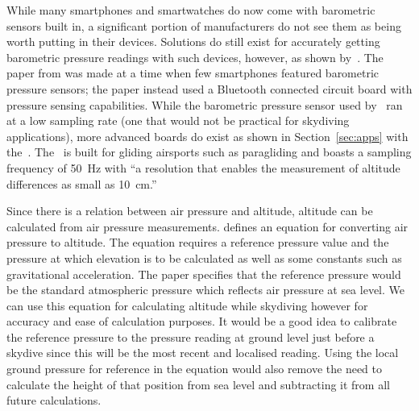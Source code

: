 \documentclass[11pt, twocolumn]{article}
\begin{document}
While many smartphones and smartwatches do now come with barometric sensors built in, a significant portion of manufacturers do not see them as being worth putting in their devices. Solutions do still exist for accurately getting barometric pressure readings with such devices, however, as shown by~\textcite{he_atmospheric_2012}. The paper from \citeyear{he_atmospheric_2012} was made at a time when few smartphones featured barometric pressure sensors; the paper instead used a Bluetooth connected circuit board with pressure sensing capabilities. While the barometric pressure sensor used by~\textcite{he_atmospheric_2012} ran at a low sampling rate (one that would not be practical for skydiving applications), more advanced boards do exist as shown in Section~\ref{sec:apps} with the~.
The~ is built for gliding airsports such as paragliding and boasts a sampling frequency of \SI{50}{\Hz} with ``a resolution that enables the measurement of altitude differences as small as \SI{10}{\cm}.''

Since there is a relation between air pressure and altitude, altitude can be calculated from air pressure measurements. \textcite{liu_beyond_2014} defines an equation for converting air pressure to altitude. The equation requires a reference pressure value and the pressure at which elevation is to be calculated as well as some constants such as gravitational acceleration. The paper specifies that the reference pressure would be the standard atmospheric pressure which reflects air pressure at sea level. We can use this equation for calculating altitude while skydiving however for accuracy and ease of calculation purposes. It would be a good idea to calibrate the reference pressure to the pressure reading at ground level just before a skydive since this will be the most recent and localised reading. Using the local ground pressure for reference in the equation would also remove the need to calculate the height of that position from sea level and subtracting it from all future calculations.
\end{document}
